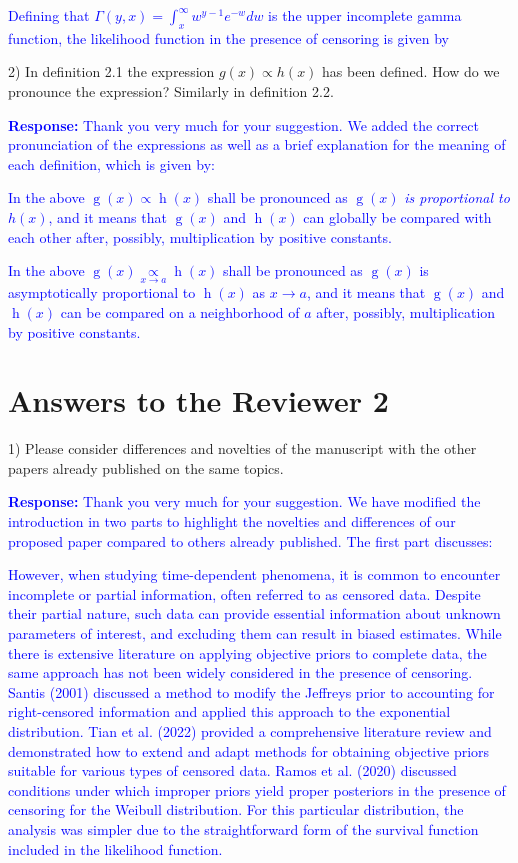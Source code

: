 \documentclass[12pt]{article}
\newcommand{\f}{\operatorname}
\begin{document}
\textcolor{blue}{Defining that $\Gamma(y,x)  =\int_{x}^{\infty}{w^{y-1}e^{-w}dw}$ is the upper incomplete gamma function, the likelihood function in the presence of censoring is given by}

2) In definition 2.1 the expression \(g(x) \propto h(x)\) has been defined. How do we pronounce the expression? Similarly in definition 2.2.

\textcolor{blue}{\textbf{Response:} Thank you very much for your suggestion. We added the correct pronunciation of the expressions as well as a brief explanation for the meaning of each definition, which is given by:}

\textcolor{blue}{In the above $\f{g}(x)\propto \f{h}(x)$ shall be pronounced as $\f{g}(x)$ \textit{is proportional to} $h(x)$, and it means that $\f{g}(x)$ and $\f{h}(x)$ can globally be compared with each other after, possibly, multiplication by positive constants.}

\textcolor{blue}{In the above $\f{g}(x)\underset{x\to a}{\propto} \f{h}(x)$ shall be pronounced as $\f{g}(x)$ is asymptotically proportional to $\f{h}(x)$ as $x\to a$, and it means that $\f{g}(x)$ and $\f{h}(x)$ can be compared on a neighborhood of $a$ after, possibly, multiplication by positive constants.} 


\section*{Answers to the Reviewer 2}

1) Please consider differences and novelties of the manuscript with the other papers already published on the same topics.

\textcolor{blue}{\textbf{Response:} Thank you very much for your suggestion. We have modified the introduction in two parts to highlight the novelties and differences of our proposed paper compared to others already published. The first part discusses:}

\textcolor{blue}{However, when studying time-dependent phenomena, it is common to encounter incomplete or partial information, often referred to as censored data. Despite their partial nature, such data can provide essential information about unknown parameters of interest, and excluding them can result in biased estimates. While there is extensive literature on applying objective priors to complete data, the same approach has not been widely considered in the presence of censoring. Santis (2001) discussed a method to modify the Jeffreys prior to accounting for right-censored information and applied this approach to the exponential distribution. Tian et al. (2022) provided a comprehensive literature review and demonstrated how to extend and adapt methods for obtaining objective priors suitable for various types of censored data. Ramos et al. (2020) discussed conditions under which improper priors yield proper posteriors in the presence of censoring for the Weibull distribution. For this particular distribution, the analysis was simpler due to the straightforward form of the survival function included in the likelihood function.}
\end{document}
